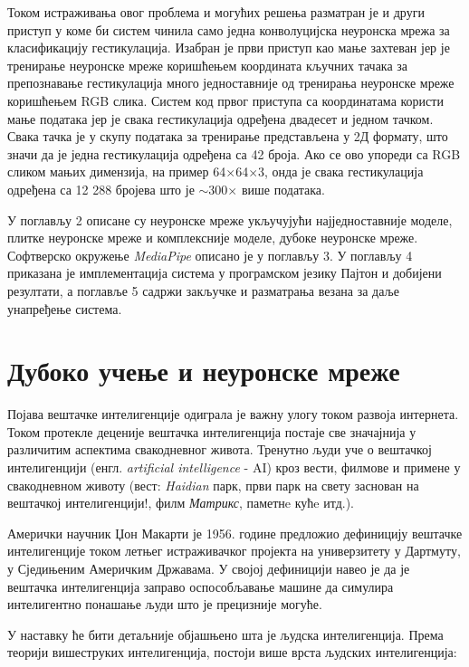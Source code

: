 \documentclass[master]{finthesis}
\begin{document}
Током истраживања овог проблема и могућих решења разматран је и други приступ у коме би систем чинила само једна конволуцијска неуронска мрежа за класификацију гестикулација. Изабран је први приступ као мање захтеван јер је тренирање неуронске мреже коришћењем координата кључних тачака за препознавање гестикулација много једноставније од тренирања неуронске мреже коришћењем RGB слика. Систем код првог приступа са координатама користи мање података јер је свака гестикулација одређена двадесет и једном тачком. Свака тачка је у скупу података за тренирање представљена у 2Д формату, што значи да је једна гестикулација одређена са 42 броја. Ако се ово упореди са RGB сликом мањих димензија, на пример 64$\times$64$\times$3, онда је свака гестикулација одређена са 12 288 бројева што је $\sim$300$\times$ више података.

У поглављу 2 описане су неуронске мреже укључујући најједноставније моделе, плитке неуронске мреже и комплексније моделе, дубоке неуронске мреже. Софтверско окружење \textit{MediaPipe} описано је у поглављу 3. У поглављу 4 приказана је имплементација система  у програмском језику Пајтон и добијени резултати, а поглавље 5 садржи закључке и разматрања везана за даље унапређење система. 

\section{Дубоко учење и неуронске мреже}

Појава вештачке интелигенције одиграла је важну улогу током развоја интернета. Током протекле деценије вештачка интелигенција постаје све значајнија у различитим аспектима свакодневног живота. Тренутно људи уче о вештачкој интелигенцији (енгл. \textit{artificial intelligence} - AI) кроз вести, филмове и примене у свакодневном животу (вест: \textit{Haidian} парк, први парк на свету заснован на вештачкој интелигенцији!, филм \textit{Матрикс}, паметнe кућe итд.). 

Амерички научник Џон Макарти је 1956. године предложио дефиницију вештачке интелигенције током летњег истраживачког пројекта на универзитету у Дартмуту, у Сједињеним Америчким Државама. У својој дефиницији навео је да је вештачка интелигенција заправо оспособљавање машине да симулира интелигентно понашање људи што је прецизније могуће.

У наставку ће бити детаљније објашњено шта је људска интелигенција. Према теорији вишеструких интелигенција, постоји више врста људских интелигенција: 
\end{document}
